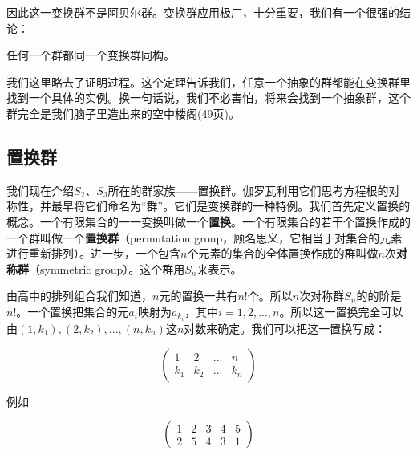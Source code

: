 \documentclass[b5paper]{ctexart}
\begin{document}
因此这一变换群不是阿贝尔群。变换群应用极广，十分重要，我们有一个很强的结论：

\begin{theorem}
任何一个群都同一个变换群同构。
\end{theorem}

我们这里略去了证明过程。这个定理告诉我们，任意一个抽象的群都能在变换群里找到一个具体的实例。换一句话说，我们不必害怕，将来会找到一个抽象群，这个群完全是我们脑子里造出来的空中楼阁\cite{ZhangHeRui1978}(49页)。

\begin{Exercise}
\end{Exercise}

\subsection{置换群}
\label{permutation group}
\label{symmetric group}

我们现在介绍$S_2$、$S_3$所在的群家族——置换群。伽罗瓦利用它们思考方程根的对称性，并最早将它们命名为“群”。它们是变换群的一种特例。我们首先定义置换的概念。一个有限集合的一一变换叫做一个\textbf{置换}。一个有限集合的若干个置换作成的一个群叫做一个\textbf{置换群}（permutation group，顾名思义，它相当于对集合的元素进行重新排列）。进一步，一个包含$n$个元素的集合的全体置换作成的群叫做$n$次\textbf{对称群}（symmetric group）。这个群用$S_n$来表示。

由高中的排列组合我们知道，$n$元的置换一共有$n!$个。所以$n$次对称群$S_n$的的阶是$n!$。一个置换把集合的元$a_i$映射为$a_{k_i}$，其中$i = 1, 2, ..., n$。所以这一置换完全可以由$(1, k_1), (2, k_2), ..., (n, k_n)$这$n$对数来确定。我们可以把这一置换写成：

\[
\begin{pmatrix}
1 & 2 & ... & n \\
k_1 & k_2 & ... & k_n
\end{pmatrix}
\]

例如

\[
\begin{pmatrix}
1 & 2 & 3 & 4 & 5 \\
2 & 5 & 4 & 3 & 1
\end{pmatrix}
\]
\end{document}
